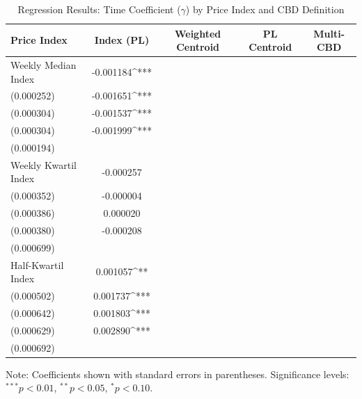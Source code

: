 \begin{table}[h!]
\centering
\caption{Regression Results: Time Coefficient ($\gamma$) by Price Index and CBD Definition}
\label{tab:gammas_results}
\begin{tabular}{lcccc}
\toprule
Price Index & Index (PL) & Weighted Centroid & PL Centroid & Multi-CBD \\
\midrule
Weekly Median Index & -0.001184^{***}\\ (0.000252) & -0.001651^{***}\\ (0.000304) & -0.001537^{***}\\ (0.000304) & -0.001999^{***}\\ (0.000194) \\
Weekly Kwartil Index & -0.000257\\ (0.000352) & -0.000004\\ (0.000386) & 0.000020\\ (0.000380) & -0.000208\\ (0.000699) \\
Half-Kwartil Index & 0.001057^{**}\\ (0.000502) & 0.001737^{***}\\ (0.000642) & 0.001803^{***}\\ (0.000629) & 0.002890^{***}\\ (0.000692) \\
\bottomrule
\end{tabular}
\begin{tablenotes}[para]
\small
Note: Coefficients shown with standard errors in parentheses.
Significance levels: $^{***} p<0.01$, $^{**} p<0.05$, $^{*} p<0.10$.
\end{tablenotes}
\end{table}